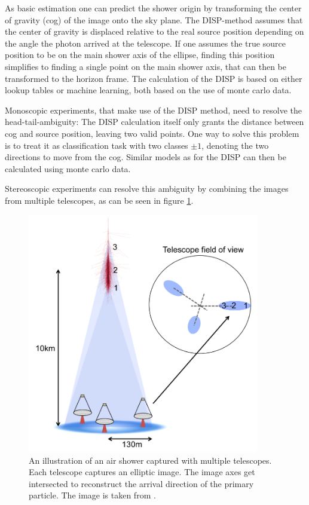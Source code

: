 As basic estimation one can predict the shower origin by 
transforming the center of gravity (cog) of the image onto the sky plane.
The DISP-method assumes that the 
center of gravity is displaced relative to the
real source position depending on the angle the photon arrived at the telescope.
If one assumes the true source position to be on the main shower axis of the ellipse,
finding this position simplifies to finding a single point on the main shower axis, that 
can then be transformed to the horizon frame.
The calculation of the DISP is based on either lookup tables or machine learning,
both based on the use of monte carlo data.

Monoscopic experiments, that make use of the DISP method, need to resolve the head-tail-ambiguity:
The DISP calculation itself only grants the distance between
cog and source position, leaving two valid points.
One way to solve this problem is to treat it as classification task with two
classes $\pm1$, denoting the two directions to move from the cog.
Similar models as for the DISP can then be calculated using monte carlo data.

Stereoscopic experiments can resolve this ambiguity by combining the images from 
multiple telescopes, as can be seen in figure \ref{fig:stereo_shower}.

\begin{figure}
	\centering
	\captionsetup{width=0.9\linewidth}
	\hspace*{0.1\textwidth}\includegraphics[width=0.9\textwidth]{images/stereo_shower.png}
	\caption{An illustration of an air shower captured with multiple telescopes.
		Each telescope captures an elliptic image.
		The image axes get intersected to reconstruct the arrival direction
		of the primary particle.
	    The image is taken from \cite{2015arXiv151005675H}.}
	\label{fig:stereo_shower}
\end{figure}

